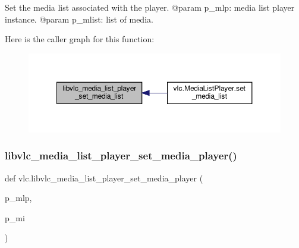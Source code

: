 \begin{DoxyVerb}Set the media list associated with the player.
@param p_mlp: media list player instance.
@param p_mlist: list of media.
\end{DoxyVerb}
 Here is the caller graph for this function\+:
\nopagebreak
\begin{figure}[H]
\begin{center}
\leavevmode
\includegraphics[width=350pt]{namespacevlc_ad7bd543571d19ee4ae115ec8ff31db94_icgraph}
\end{center}
\end{figure}
\mbox{\label{namespacevlc_ae77d2d55e63161551bc26b440c28743c}} 
\subsubsection{\texorpdfstring{libvlc\+\_\+media\+\_\+list\+\_\+player\+\_\+set\+\_\+media\+\_\+player()}{libvlc\_media\_list\_player\_set\_media\_player()}}
{\footnotesize\ttfamily def vlc.\+libvlc\+\_\+media\+\_\+list\+\_\+player\+\_\+set\+\_\+media\+\_\+player (\begin{DoxyParamCaption}\item[{}]{p\+\_\+mlp,  }\item[{}]{p\+\_\+mi }\end{DoxyParamCaption})}

